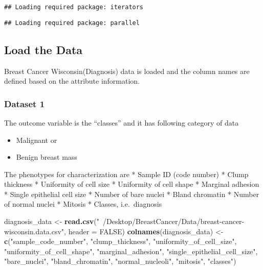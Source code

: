 \documentclass[]{article}
\newenvironment{Shaded}{\begin{snugshade}}{\end{snugshade}}
\newcommand{\KeywordTok}[1]{\textcolor[rgb]{0.13,0.29,0.53}{\textbf{#1}}}
\newcommand{\DataTypeTok}[1]{\textcolor[rgb]{0.13,0.29,0.53}{#1}}
\newcommand{\StringTok}[1]{\textcolor[rgb]{0.31,0.60,0.02}{#1}}
\newcommand{\OtherTok}[1]{\textcolor[rgb]{0.56,0.35,0.01}{#1}}
\newcommand{\NormalTok}[1]{#1}
\providecommand{\tightlist}{%
  \setlength{\itemsep}{0pt}\setlength{\parskip}{0pt}}
\begin{document}
\begin{verbatim}
## Loading required package: iterators
\end{verbatim}

\begin{verbatim}
## Loading required package: parallel
\end{verbatim}

\subsection{Load the Data}\label{load-the-data}

Breast Cancer Wisconsin(Diagnosis) data is loaded and the column names
are defined based on the attribute information.

\subsubsection{Dataset 1}\label{dataset-1}

The outcome variable is the ``classes'' and it has following category of
data

\begin{itemize}
\tightlist
\item
  Malignant or
\item
  Benign breast mass
\end{itemize}

The phenotypes for characterization are * Sample ID (code number) *
Clump thickness * Uniformity of cell size * Uniformity of cell shape *
Marginal adhesion * Single epithelial cell size * Number of bare nuclei
* Bland chromatin * Number of normal nuclei * Mitosis * Classes,
i.e.~diagnosis

\begin{Shaded}
\begin{Highlighting}[]
\NormalTok{diagnosis_data <-}\StringTok{ }\KeywordTok{read.csv}\NormalTok{(}\StringTok{"~/Desktop/BreastCancer/Data/breast-cancer-wisconsin.data.csv"}\NormalTok{, }\DataTypeTok{header =} \OtherTok{FALSE}\NormalTok{)}
\KeywordTok{colnames}\NormalTok{(diagnosis_data) <-}\StringTok{ }\KeywordTok{c}\NormalTok{(}\StringTok{"sample_code_number"}\NormalTok{, }\StringTok{"clump_thickness"}\NormalTok{, }\StringTok{"uniformity_of_cell_size"}\NormalTok{, }\StringTok{"uniformity_of_cell_shape"}\NormalTok{, }\StringTok{"marginal_adhesion"}\NormalTok{, }\StringTok{"single_epithelial_cell_size"}\NormalTok{, }
                       \StringTok{"bare_nuclei"}\NormalTok{, }\StringTok{"bland_chromatin"}\NormalTok{, }\StringTok{"normal_nucleoli"}\NormalTok{, }\StringTok{"mitosis"}\NormalTok{, }\StringTok{"classes"}\NormalTok{)}
\end{Highlighting}
\end{Shaded}
\end{document}
